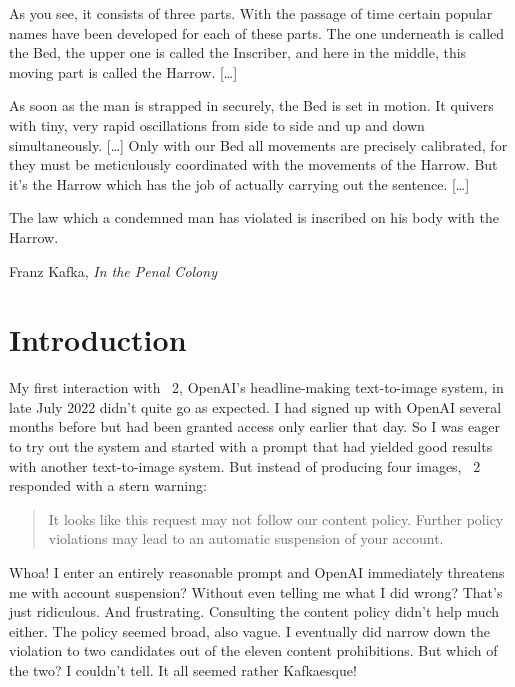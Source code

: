 \newenvironment{kafkaesque}{
    \setlength{\parindent}{\normalparindent}
}{}
\renewcommand{\textflush}{kafkaesque}
\setlength{\epigraphwidth}{0.8\textwidth}

\epigraph{\noindent\openfat{}As you see, it consists of three parts. With the
passage of time certain popular names have been developed for each of these
parts. The one underneath is called the Bed, the upper one is called the
Inscriber, and here in the middle, this moving part is called the Harrow.
[\ldots]

As soon as the man is strapped in securely, the Bed is set in motion. It quivers
with tiny, very rapid oscillations from side to side and up and down
simultaneously. [\ldots] Only with our Bed all movements are precisely
calibrated, for they must be meticulously coordinated with the movements of the
Harrow. But it's the Harrow which has the job of actually carrying out the
sentence. [\ldots]

The law which a condemned man has violated is inscribed on his body with the
Harrow.\closefat}{Franz Kafka, \emph{In the Penal Colony}~\cite{Kafka1995}}


\section{Introduction}
\label{sec:introduction}

My first interaction with \DALLE~2, OpenAI's headline-making text-to-image
system, in late July 2022 didn't quite go as expected. I had signed up with
OpenAI several months before but had been granted access only earlier that day.
So I was eager to try out the system and started with a prompt that had yielded
good results with another text-to-image system. But instead of producing four
images, \DALLE~2 responded with a stern warning:
\begin{quote}
\openfat{}It looks like this request may not follow our content policy. Further
policy violations may lead to an automatic suspension of your
account.\closefat{}
\end{quote}
Whoa! I enter an entirely reasonable prompt and OpenAI immediately threatens me
with account suspension? Without even telling me what I did wrong? That's just
ridiculous. And frustrating. Consulting the content policy didn't help much
either. The policy seemed broad, also vague. I eventually did narrow down the
violation to two candidates out of the eleven content prohibitions. But which of
the two? I couldn't tell. It all seemed rather Kafkaesque!

